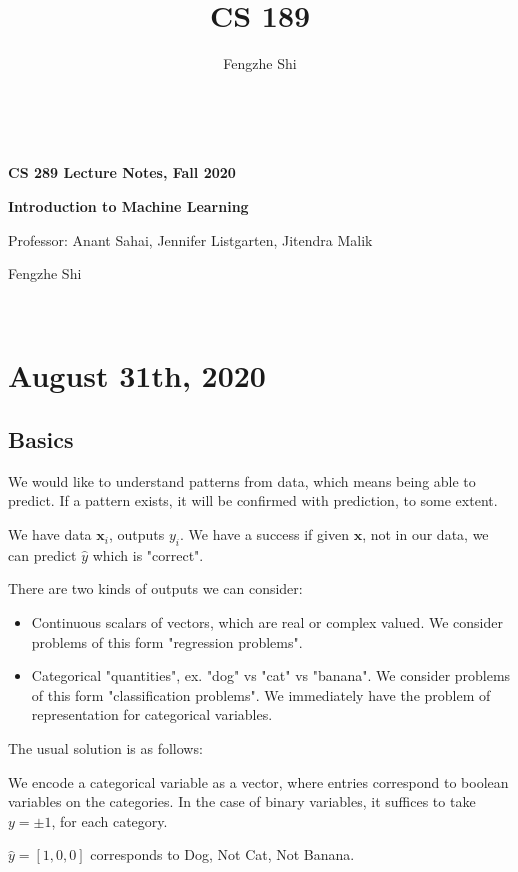 \documentclass[11pt]{article}
\newcommand{\Vx}{\mathbf{x}}
\begin{document}
\title{CS 189}
\author{Fengzhe Shi}
\thispagestyle{empty}
$ $
\vfill
\begin{center}

\centerline{\huge \textbf{CS 289 Lecture Notes, Fall 2020}}
\centerline{\Large \textbf{Introduction to Machine Learning} } 
\centerline{Professor: Anant Sahai, Jennifer Listgarten, Jitendra Malik}
\centerline{Fengzhe Shi}
\end{center}
\vfill
$ $
\newpage
\thispagestyle{empty}
\tableofcontents
\newpage
\section{August 31th, 2020}
\subsection{Basics}
We would like to understand patterns from data, which means being able to predict.  If a pattern exists, it will be confirmed with prediction, to some extent.

\begin{definition}
     We have data $\Vx_i$, outputs $y_i$. We have a success if given $\Vx$, not in our data, we can predict $\hat{y}$ which is "correct".
\end{definition}
There are two kinds of outputs we can consider:
\begin{itemize}
\item Continuous scalars of vectors, which are real or complex valued.  We consider problems of this form "regression problems".
\item Categorical "quantities", ex. "dog" vs "cat" vs "banana".  We consider problems of this form "classification problems".  We immediately have the problem of representation for categorical variables.
\end{itemize}

The usual solution is as follows:
\begin{definition} We encode a categorical variable as a vector, where entries correspond to boolean variables on the categories.   In the case of binary variables, it suffices to take $y = \pm 1$, for each category.
\end{definition}
\begin{example}
    $\hat{y} = [1, 0, 0]$ corresponds to Dog, Not Cat, Not Banana.  
\end{example}
\end{document}
